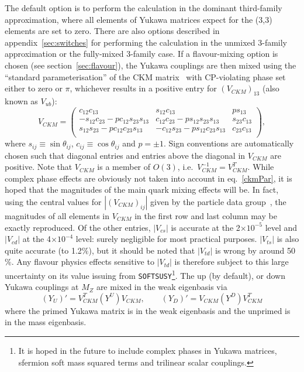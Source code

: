\documentclass[]{article}
\begin{document}
The default option is to perform the calculation in the 
dominant third-family approximation, where all elements of Yukawa matrices
expect for the (3,3) elements are set to zero.
There are also options described in
appendix~\ref{sec:switches} for performing the calculation in the unmixed
3-family approximation or the fully-mixed 3-family case.
If a flavour-mixing option is chosen (see section~\ref{sec:flavour}),
the Yukawa couplings are then mixed using the ``standard parameterisation''
of the CKM matrix~\cite{Groom:2000in} with CP-violating phase set either to
zero or $\pi$, whichever results in a positive entry for $(V_{CKM})_{13}$
(also known as $V_{ub}$):
\begin{equation}
V_{CKM} = \left( \begin{array} {ccc}
c_{12} c_{13}   & s_{12} c_{13}   & p s_{13} \\
-s_{12} c_{23} -p c_{12} s_{23} s_{13} & c_{12} c_{23} -p s_{12} s_{23} s_{13} & 
s_{23} c_{13} \\
s_{12} s_{23} - p c_{12} c_{23} s_{13} & -c_{12} s_{23} - p s_{12} c_{23} s_{13} &
c_{23} c_{13} \\
\end{array} \right), \label{ckmPar}
\end{equation}
where $s_{ij}\equiv \sin \theta_{ij}$, $c_{ij}\equiv \cos \theta_{ij}$ and
$p=\pm 1$. Sign conventions are automatically chosen such that diagonal entries and entries
above the diagonal in $V_{CKM}$ are positive. Note that $V_{CKM}$ is a member
of $O(3)$, i.e.\ $V_{CKM}^{-1}= V_{CKM}^T$.
While complex phase effects are obviously not taken into account in
eq.~\ref{ckmPar}, it is hoped that the magnitudes of the main quark mixing
effects will be. In fact, using the central values for $|(V_{CKM})_{ij}|$
given by 
the particle data group~\cite{Groom:2000in}, the magnitudes of all elements in
$V_{CKM}$ in the 
first row and last column may be exactly reproduced. Of the other entries, 
$|V_{cs}|$ is accurate at the 2$\times 10^{-5}$ level and
$|V_{cd}|$ at the 4$\times 10^{-4}$ level: surely negligible for most practical
purposes. $|V_{ts}|$ is also quite accurate (to 1.2$\%$), but 
it should be noted that $|V_{td}|$ is wrong by around 50$\%$. Any
flavour physics effects sensitive to $|V_{td}|$ is therefore subject to
this large uncertainty on its value issuing from {\tt SOFTSUSY}\footnote{It is
  hoped 
in the future to include complex phases in Yukawa matrices,
sfermion soft mass squared terms and trilinear scalar couplings.}.
The up (by default), or down Yukawa couplings at $M_Z$ are mixed in the
weak eigenbasis via
\begin{equation}
(Y_U)'=V_{CKM}^T (Y^U) V_{CKM}, \qquad 
(Y_D)'=V_{CKM} (Y^D) V_{CKM}^T \label{ckm}
\end{equation}
where the primed Yukawa matrix is in the weak eigenbasis and the unprimed is
in the mass eigenbasis. 
\end{document}
